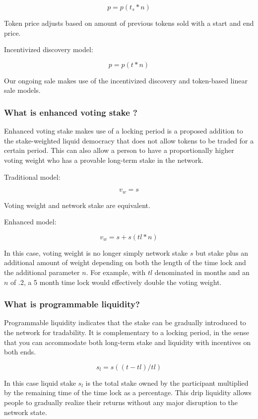 \documentclass{article}
\begin{document}
\[ p = p (t_s * n)  \]

Token price adjusts based on amount of previous tokens sold with a start and end price.

Incentivized discovery model:

\[ p = p (t * n)  \]

Our ongoing sale makes use of the incentivized discovery and token-based linear sale models.

\subsubsection {What is enhanced voting stake ?}

Enhanced voting stake makes use of a locking period is a proposed addition to the stake-weighted liquid democracy that does not allow tokens to be traded for a certain period. This can also allow a person to have a proportionally higher voting weight who has a provable long-term stake in the network.

Traditional model:

\[ v_w = s \]

Voting weight and network stake are equivalent.


Enhanced model:

\[ v_w = s + s ( tl * n ) \]

In this case, voting weight is no longer simply network stake $s$ but stake plus an additional amount of weight depending on both the length of the time lock and the additional parameter $n$. For example, with $tl$ denominated in months and an $n$ of .2, a 5 month time lock would effectively double the voting weight.

\subsubsection {What is programmable liquidity?}

Programmable liquidity indicates that the stake can be gradually introduced to the network for tradability. It is complementary to a locking period, in the sense that you can accommodate both long-term stake and liquidity with incentives on both ends.

\[ s_l = s ( (t - tl ) / tl ) \]

In this case liquid stake $s_l$ is the total stake owned by the participant multiplied by the remaining time of the time lock as a percentage. This drip liquidity allows people to gradually realize their returns without any major disruption to the network state.
\end{document}
